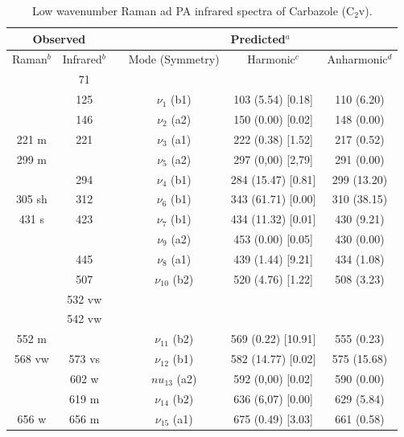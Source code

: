 	
	\begin{table}[H]
		\caption{Low wavenumber Raman ad PA infrared spectra of Carbazole (C$_{2}$v).}
		\begin{center}
			\begin{threeparttable}
				\begin{tabular}{c c c c c c}
					\hline
					\multicolumn{ 2}{c}{Observed} & \multicolumn{1}{c}{} & \multicolumn{ 3}{c}{Predicted$^{a}$} \\ \hline
					Raman$^{b}$ & \multicolumn{1}{c}{Infrared$^{b}$} &  & \multicolumn{1}{c}{Mode (Symmetry)} & \multicolumn{1}{c}{Harmonic$^{c}$} & Anharmonic$^{d}$ \\ \hline
	 & \multicolumn{1}{c}{71} &  &  &  &  \\ 
	 & \multicolumn{1}{c}{125} &  & $\nu_{1}$ (b1) & 103 (5.54) [0.18] & 110 (6.20) \\ 
	 & \multicolumn{1}{c}{146} &  & $\nu_{2}$ (a2) & 150 (0.00) [0.02] & 148 (0.00) \\ 
	 221 m & \multicolumn{1}{c}{221} &  & $\nu_{3}$ (a1) & 222 (0.38) [1.52] & 217 (0.52) \\ 
	 299 m &  &  & $\nu_{5}$ (a2) & 297 (0,00) [2,79] & 291 (0.00) \\ 
	 & \multicolumn{1}{c}{294} &  & $\nu_{4}$ (b1) & 284 (15.47) [0.81] & 299 (13.20) \\ 
	 305 sh & \multicolumn{1}{c}{312} &  & $\nu_{6}$ (b1) & 343 (61.71) [0.00] & 310 (38.15) \\ 
	 431 s & \multicolumn{1}{c}{423} &  & $\nu_{7}$ (b1) & 434 (11.32) [0.01] & 430 (9.21) \\ 
	 &  &  & $\nu_{9}$ (a2) & 453 (0.00) [0.05] & 430 (0.00) \\
	 & \multicolumn{1}{c}{445} &  & $\nu_{8}$ (a1) & 439 (1.44) [9.21] & 434 (1.08) \\ 
	 & \multicolumn{1}{c}{507} &  & $\nu_{10}$ (b2)
	 & 520 (4.76) [1.22] & 508 (3.23) \\ 
	 & 532 vw &  &  &  &  \\ 
	 & 542 vw &  &  &  &  \\ 
	 552 m &  &  & $\nu_{11}$ (b2) 
	 & 569 (0.22) [10.91] & 555 (0.23)
	 \\ 
	 568 vw & 573 vs &  & $\nu_{12}$ (b1)  & 582 (14.77) [0.02] &  575 (15.68)
	 \\ 
	 & 602 w &  & $nu_{13}$ (a2) & 592 (0,00) [0.02] & 590 (0.00) \\ 
	 & 619 m &  & $\nu_{14}$ (b2) & 636 (6,07) [0.00] & 629 (5.84) \\ 
	 656 w & 656 m &  & $\nu_{15}$ (a1)	 & 675 (0.49) [3.03] & 661 (0.58) \\ 
	

\end{tabular}
\end{threeparttable}
\end{center}
\end{table}
